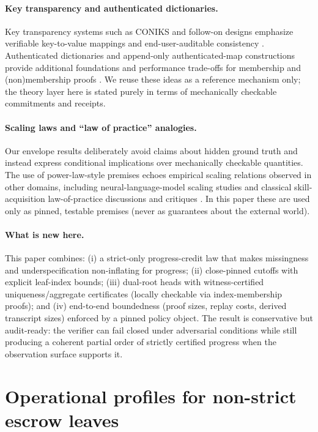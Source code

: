 \documentclass[11pt]{article}
\newcommand{\1}{\mathbf{1}}
\theoremstyle{definition}
\theoremstyle{plain}
\begin{document}
\paragraph{Key transparency and authenticated dictionaries.}
Key transparency systems such as CONIKS and follow-on designs emphasize verifiable key-to-value mappings and end-user-auditable consistency \cite{MelaraCONIKS2015,MalvaiParakeet2023,LenOPTIKS2024}. Authenticated dictionaries and append-only authenticated-map constructions provide additional foundations and performance trade-offs for membership and (non)membership proofs \cite{TamassiaADS2003,TomescuAAD2019}. We reuse these ideas as a reference mechanism only; the theory layer here is stated purely in terms of mechanically checkable commitments and receipts.

\paragraph{Scaling laws and ``law of practice'' analogies.}
Our envelope results deliberately avoid claims about hidden ground truth and instead express conditional implications over mechanically checkable quantities. The use of power-law-style premises echoes empirical scaling relations observed in other domains, including neural-language-model scaling studies \cite{KaplanScaling2020,HoffmannChinchilla2022} and classical skill-acquisition law-of-practice discussions and critiques \cite{NewellRosenbloom1981,HeathcotePowerLaw2000}. In this paper these are used only as pinned, testable premises (never as guarantees about the external world).

\paragraph{What is new here.}
This paper combines: (i) a strict-only progress-credit law that makes missingness and underspecification non-inflating for progress; (ii) close-pinned cutoffs with explicit leaf-index bounds; (iii) dual-root heads with witness-certified uniqueness/aggregate certificates (locally checkable via index-membership proofs); and (iv) end-to-end boundedness (proof sizes, replay costs, derived transcript sizes) enforced by a pinned policy object. The result is conservative but audit-ready: the verifier can fail closed under adversarial conditions while still producing a coherent partial order of strictly certified progress when the observation surface supports it.


\section{Operational profiles for non-strict escrow leaves}
\label{app:escrow_ops}
\end{document}
